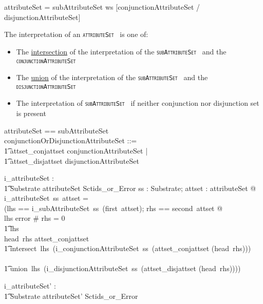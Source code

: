 \documentclass{article}
\def\spec#1{{\tt \small \textsc{{#1}} }}
\def\bnf#1{{\scriptsize {{#1}} }}
\begin{document}
\begin{framed}
\noindent
\bnf{attributeSet = subAttributeSet ws [conjunctionAttributeSet / disjunctionAttributeSet]}
\end{framed}

The interpretation of an \spec{attributeSet} is one of:
\begin{itemize}[noitemsep,nolistsep]
\item The \underline{intersection} of the interpretation of the \spec{subAttributeSet} and the \spec{conjunctionAttributeSet}
\item The \underline{union} of the interpretation of the \spec{subAttributeSet} and the \spec{disjunctionAttributeSet}
\item The interpretation of  \spec{subAttributeSet} if neither conjunction nor disjunction set is present
\end{itemize}


\begin{zed}
attributeSet == subAttributeSet \cross \optional[conjunctionOrDisjunctionAttributeSet] \\
[attributeSet']
\also
conjunctionOrDisjunctionAttributeSet ::= \\
\t1 attset\_conjattset \ldata conjunctionAttributeSet \rdata | \\
\t1 attset\_disjattset \ldata disjunctionAttributeSet \rdata
\end{zed}

\begin{axdef}
   i\_attributeSet : \\
\t1 Substrate \fun attributeSet \fun Sctids\_or\_Error
\where
   \forall ss : Substrate; attset : attributeSet @ \\
   i\_attributeSet~ss~attset = \\
   (\LET lhs == i\_subAttributeSet~ss~(first~attset); rhs == second~attset @ \\
 \IF lhs \in \ran error \lor \# rhs = 0 \THEN \\
 \t1 lhs \\
 \ELSE \IF head~rhs \in \ran attset\_conjattset \THEN \\
 \t1  intersect~lhs~(i\_conjunctionAttributeSet~ss~(attset\_conjattset \inv (head~rhs))) \\
  \ELSE \\
  \t1 union~lhs~(i\_disjunctionAttributeSet~ss~(attset\_disjattset \inv (head~rhs))))
\end{axdef}

\begin{axdef}
   i\_attributeSet' : \\
\t1 Substrate \fun attributeSet' \fun Sctids\_or\_Error
\end{axdef}
\end{document}
